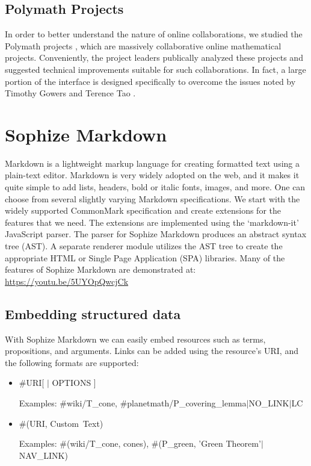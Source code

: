 \documentclass[]{ceurart}
\begin{document}
\subsection{Polymath Projects}
In order to better understand the nature of online collaborations, we studied the Polymath projects \cite{polymath_blog}, which are massively collaborative online mathematical projects. Conveniently, the project leaders publically analyzed these projects and suggested technical improvements suitable for such collaborations. In fact, a large portion of the interface is designed specifically to overcome the issues noted by Timothy Gowers \cite{gowers_weblog_2009} and Terence Tao \cite{whats_new_2009}.

\section{Sophize Markdown}

Markdown is a lightweight markup language for creating formatted text using a plain-text editor. Markdown is very widely adopted on the web, and it makes it quite simple to add lists, headers, bold or italic fonts, images, and more. One can choose from several slightly varying Markdown specifications. We start with the widely supported CommonMark specification and create extensions for the features that we need. The extensions are implemented using the `markdown-it' \cite{markdown_it} JavaScript parser. The parser for Sophize Markdown produces an abstract syntax tree (AST). A separate renderer module utilizes the AST tree to create the appropriate HTML or Single Page Application (SPA) libraries. Many of the features of Sophize Markdown are demonstrated at: \url{https://youtu.be/5UYOpQwcjCk}

\subsection{Embedding structured data}

With Sophize Markdown we can easily embed resources such as terms, propositions, and arguments. Links can be added using the resource's URI, and the following formats are supported:


\begin{itemize}

	\item \#URI[ $\vert$ OPTIONS ]

	Examples: \#wiki/T\_cone, \#planetmath/P\_covering\_lemma$\vert$NO\_LINK$\vert$LC

	\item \#(URI, \textquotesingle Custom\ Text)

	Examples: \#(wiki/T\_cone, \textquotesingle cones\textquotesingle), \#(P\_green, 'Green Theorem'$\vert$NAV\_LINK)

\end{itemize}
\end{document}
